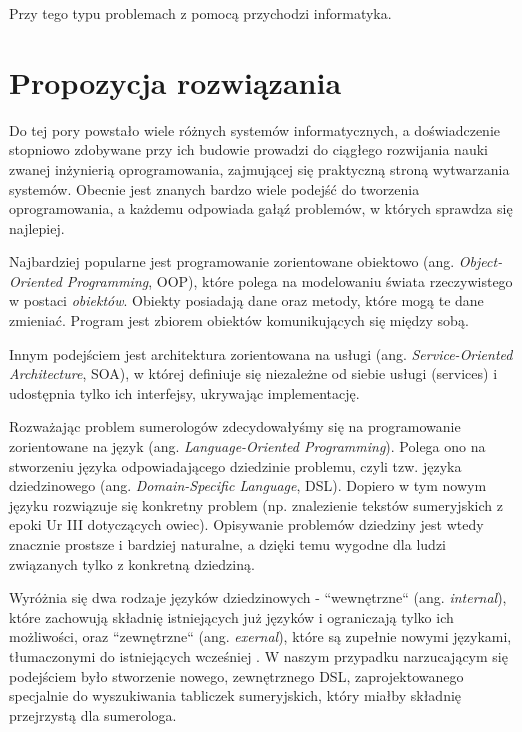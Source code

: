 Przy tego typu problemach z pomocą przychodzi informatyka. 

\section*{Propozycja rozwiązania}
Do tej pory powstało wiele różnych systemów informatycznych, a doświadczenie stopniowo zdobywane przy ich budowie prowadzi do 
ciągłego rozwijania nauki zwanej inżynierią oprogramowania, zajmującej się praktyczną stroną wytwarzania systemów. Obecnie jest 
znanych bardzo wiele podejść do tworzenia oprogramowania, a każdemu odpowiada gałąź problemów, w których sprawdza się najlepiej. 

Najbardziej popularne jest programowanie zorientowane obiektowo (ang. \emph{Object-Oriented Programming}, OOP), które polega na modelowaniu 
świata rzeczywistego w postaci \textit{obiektów}. Obiekty posiadają dane oraz metody, które mogą te dane zmieniać. Program jest zbiorem 
obiektów komunikujących się między sobą. 

Innym podejściem jest architektura zorientowana na usługi (ang. \emph{Service-Oriented Architecture}, SOA), w której definiuje się 
niezależne od siebie usługi (services) i udostępnia tylko ich interfejsy, ukrywając implementację.

Rozważając problem sumerologów zdecydowałyśmy się na programowanie zorientowane na język (ang. \emph{Language-Oriented Programming}). 
Polega ono na stworzeniu języka odpowiadającego dziedzinie problemu, czyli tzw. języka dziedzinowego (ang. \emph{Domain-Specific Language},
 DSL). Dopiero w tym nowym języku rozwiązuje się konkretny problem (np. znalezienie tekstów sumeryjskich z epoki Ur III dotyczących owiec). 
Opisywanie problemów dziedziny jest wtedy znacznie prostsze i bardziej naturalne, a dzięki temu wygodne dla ludzi związanych tylko z 
konkretną dziedziną. 

Wyróżnia się dwa rodzaje języków dziedzinowych - ``wewnętrzne`` (ang. \emph{internal}), które zachowują składnię istniejących już języków 
i ograniczają tylko ich możliwości, oraz ``zewnętrzne`` (ang. \emph{exernal}), które są zupełnie nowymi językami, tłumaczonymi do 
istniejących wcześniej \cite{fowler}. W naszym przypadku narzucającym się podejściem było stworzenie nowego, zewnętrznego DSL, zaprojektowanego 
specjalnie do wyszukiwania tabliczek sumeryjskich, który miałby składnię przejrzystą dla sumerologa. 

